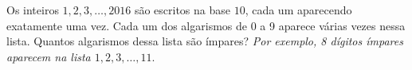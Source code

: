 Os inteiros $1, 2, 3, \dots, 2016$ são escritos na base $10$, cada um aparecendo exatamente uma vez. Cada um dos algarismos de 0 a 9 aparece várias vezes nessa lista. Quantos algarismos dessa lista são ímpares? \textit{Por exemplo, 8 dígitos ímpares aparecem na lista $1, 2, 3, \dots, 11.$}